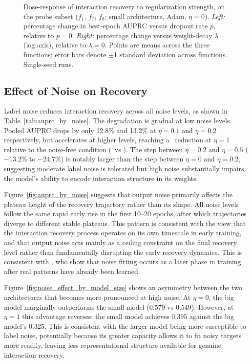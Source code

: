 \documentclass{article}
\begin{document}
\begin{figure}[htbp]
    \centering
    
    \caption{Dose-response of interaction recovery to regularization strength,
    on the probe subset ($f_1$, $f_7$, $f_8$; small architecture, Adam,
    $\eta = 0$). \textit{Left:} percentage change in best-epoch AUPRC versus
    dropout rate $p$, relative to $p = 0$. \textit{Right:} percentage change
    versus weight-decay $\lambda$ (log axis), relative to $\lambda = 0$. Points
    are means across the three functions; error bars denote $\pm$1 standard
    deviation across functions. Single-seed runs.}
    \label{fig:dose_response}
\end{figure}
\FloatBarrier
\subsection{Effect of Noise on Recovery}
\label{sec:effect_of_noise}

Label noise reduces interaction recovery across all noise
levels, as shown in Table~\ref{tab:auprc_by_noise}. The degradation is
gradual at low noise levels. Pooled AUPRC drops by only 12.8\% and
13.2\% at $\eta = 0.1$ and $\eta = 0.2$ respectively, but accelerates
at higher levels, reaching a \statNoiseDrop\ reduction at $\eta = 1$
relative to the noise-free condition (\statNoiseOneMean\ vs
\statNoiseZeroMean). The step between $\eta = 0.2$ and $\eta = 0.5$
($-$13.2\% to $-$24.7\%) is notably larger than the step between $\eta =
0$ and $\eta = 0.2$, suggesting moderate label
noise is tolerated but high noise substantially impairs the model's ability to
encode interaction structure in its weights.

Figure~\ref{fig:auprc_by_noise} suggests that output noise primarily affects the
plateau height of the recovery trajectory rather than its shape. All noise
levels follow the same rapid early rise in the first 10--20 epochs, after
which trajectories diverge to different stable plateaus. This pattern is
consistent with the view that the interaction recovery process operates on its
own timescale in early training, and that output noise acts mainly as a ceiling
constraint on the final recovery level rather than fundamentally disrupting the
early recovery dynamics. This is
consistent with \cite{arpit2017closerlookmemorizationdeep}, who show that
noise fitting occurs as a later phase in training after real patterns have
already been learned.

Figure~\ref{fig:noise_effect_by_model_size} shows an asymmetry between
the two architectures that becomes more pronounced at high noise. At
$\eta = 0$, the big model marginally outperforms the small model (0.579
vs 0.549). However, at $\eta = 1$ this advantage reverses: the small
model achieves 0.395 against the big model's 0.325. This is consistent
with the larger model being more susceptible to label noise, potentially
because its greater capacity allows it to fit noisy targets more readily,
leaving less representational structure available for genuine interaction
recovery.
\end{document}

